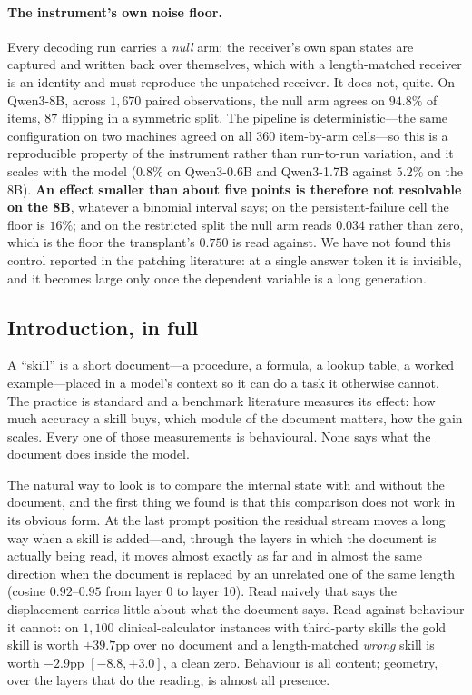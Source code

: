 \documentclass{article}
\begin{document}
\paragraph{The instrument's own noise floor.} Every decoding run carries a
\emph{null} arm: the receiver's own span states are captured and written back
over themselves, which with a length-matched receiver is an identity and must
reproduce the unpatched receiver. It does not, quite. On Qwen3-8B, across
$1{,}670$ paired observations, the null arm agrees on $94.8\%$ of items, $87$
flipping in a symmetric split. The pipeline is deterministic---the same
configuration on two machines agreed on all $360$ item-by-arm cells---so this is
a reproducible property of the instrument rather than run-to-run variation, and
it scales with the model ($0.8\%$ on Qwen3-0.6B and Qwen3-1.7B against $5.2\%$
on the 8B). \textbf{An effect smaller than about five points is therefore not
resolvable on the 8B}, whatever a binomial interval says; on the
persistent-failure cell the floor is $16\%$; and on the restricted split the
null arm reads $0.034$ rather than zero, which is the floor the transplant's
$0.750$ is read against. We have not found this control reported in the patching
literature: at a single answer token it is invisible, and it becomes large only
once the dependent variable is a long generation.




\subsection{Introduction, in full}
\label{app:intro}

A ``skill'' is a short document---a procedure, a formula, a lookup table, a
worked example---placed in a model's context so it can do a task it otherwise
cannot. The practice is standard and a benchmark literature measures its effect:
how much accuracy a skill buys, which module of the document matters, how the
gain scales. Every one of those measurements is behavioural. None says what the
document does inside the model.

The natural way to look is to compare the internal state with and without the
document, and the first thing we found is that this comparison does not work in
its obvious form. At the last prompt position the residual stream moves a long
way when a skill is added---and, through the layers in which the document is
actually being read, it moves almost exactly as far and in almost the same
direction when the document is replaced by an unrelated one of the same length
(cosine $0.92$--$0.95$ from layer 0 to layer 10). Read naively that says the
displacement carries little about what the document says. Read against behaviour
it cannot: on $1{,}100$ clinical-calculator instances with third-party skills the
gold skill is worth $+39.7$pp over no document and a length-matched \emph{wrong}
skill is worth $-2.9$pp $[-8.8, +3.0]$, a clean zero. Behaviour is all content;
geometry, over the layers that do the reading, is almost all presence.
\end{document}
